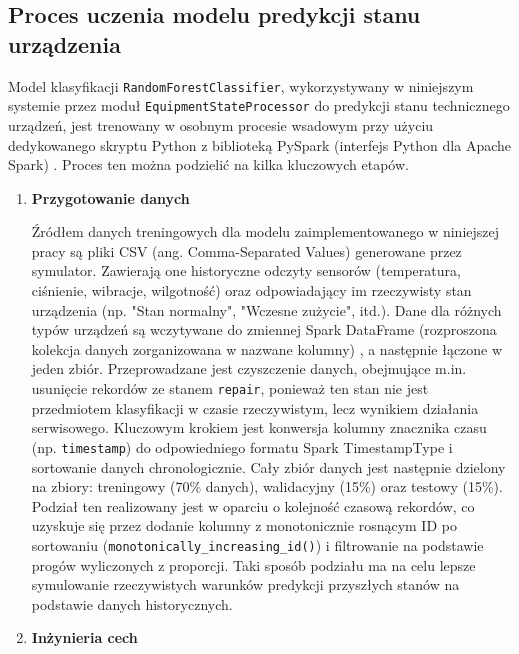 \subsection{Proces uczenia modelu predykcji stanu urządzenia}
\label{sec:uczenie_modelu_stanu}

Model klasyfikacji \texttt{RandomForestClassifier}, wykorzystywany w niniejszym systemie przez moduł \texttt{EquipmentStateProcessor} do predykcji stanu technicznego urządzeń, jest trenowany w osobnym procesie wsadowym przy użyciu dedykowanego skryptu Python z biblioteką PySpark (interfejs Python dla Apache Spark) \cite{pyspark_docs}. Proces ten można podzielić na kilka kluczowych etapów.

\begin{enumerate}

    \item \textbf{Przygotowanie danych}

Źródłem danych treningowych dla modelu zaimplementowanego w niniejszej pracy są pliki CSV (ang. Comma-Separated Values) \cite{csv_rfc} generowane przez symulator. Zawierają one historyczne odczyty sensorów (temperatura, ciśnienie, wibracje, wilgotność) oraz odpowiadający im rzeczywisty stan urządzenia (np. "Stan normalny", "Wczesne zużycie", itd.). Dane dla różnych typów urządzeń są wczytywane do zmiennej Spark DataFrame (rozproszona kolekcja danych zorganizowana w nazwane kolumny) \cite{chambers2018spark} , a następnie łączone w jeden zbiór. Przeprowadzane jest czyszczenie danych, obejmujące m.in. usunięcie rekordów ze stanem \texttt{repair}, ponieważ ten stan nie jest przedmiotem klasyfikacji w czasie rzeczywistym, lecz wynikiem działania serwisowego. Kluczowym krokiem jest konwersja kolumny znacznika czasu (np. \texttt{timestamp}) do odpowiedniego formatu Spark TimestampType i sortowanie danych chronologicznie. Cały zbiór danych jest następnie dzielony na zbiory: treningowy (70\% danych), walidacyjny (15\%) oraz testowy (15\%). Podział ten realizowany jest w oparciu o kolejność czasową rekordów, co uzyskuje się przez dodanie kolumny z monotonicznie rosnącym ID po sortowaniu (\texttt{monotonically\_increasing\_id()}) i filtrowanie na podstawie progów wyliczonych z proporcji. Taki sposób podziału ma na celu lepsze symulowanie rzeczywistych warunków predykcji przyszłych stanów na podstawie danych historycznych.

 \item \textbf{Inżynieria cech}


\end{enumerate}
